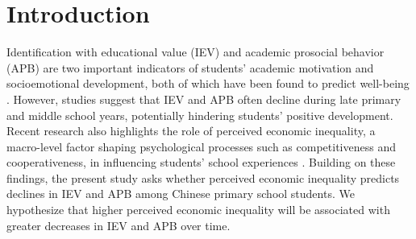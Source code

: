 \section{Introduction}

Identification with educational value (IEV) and academic prosocial behavior (APB) are two important indicators of students’ academic motivation and socioemotional development, both of which have been found to predict well-being \citep{guay2018motivation, carlo2020prosocial}. However, studies suggest that IEV and APB often decline during late primary and middle school years, potentially hindering students’ positive development. Recent research also highlights the role of perceived economic inequality, a macro-level factor shaping psychological processes such as competitiveness and cooperativeness, in influencing students’ school experiences \citep{king2022inequality, sommet2023inequality}. Building on these findings, the present study asks whether perceived economic inequality predicts declines in IEV and APB among Chinese primary school students. We hypothesize that higher perceived economic inequality will be associated with greater decreases in IEV and APB over time.

